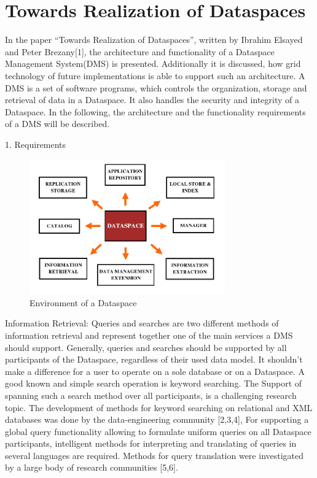 \section{Towards Realization of Dataspaces}

In the paper ``Towards Realization of Dataspaces'', written by Ibrahim Elsayed and Peter Brezany[1], the architecture and functionality of a Dataspace Management System(DMS) is presented. Additionally it is discussed, how grid technology of future implementations is able to support such an architecture. A DMS is a set of software programs, which controls the organization, storage and retrieval of data in a Dataspace. It also handles the security and integrity of a Dataspace.
In the following, the architecture and the functionality requirements of a DMS will be described.   

1. Requirements

\begin{figure}[H]
	\begin{center}
		\includegraphics[width=0.75\textwidth]{figures/TowardsRealizationOfDataspaces1.png}
	\end{center}
	\caption{Environment of  a Dataspace}
	\label{labelToRef}
\end{figure}

Information Retrieval: Queries and searches are two different methods of information retrieval and represent together one of the main services a DMS should support. Generally, queries and searches should be supported by all participants of the Dataspace, regardless of their used data model. It shouldn't make a difference for a user to operate on a sole database or on a Dataspace. A good known and simple search operation is keyword searching. The Support of spanning such a search method over all participants, is a challenging research topic. The development of methods for keyword searching on relational and XML databases was done by the data-engineering community [2,3,4], For supporting a global query functionality allowing to formulate uniform queries on all Dataspace participants, intelligent methods for interpreting and translating of queries in several languages are required. Methods for query translation were investigated by a large body of research communities [5,6]. 

